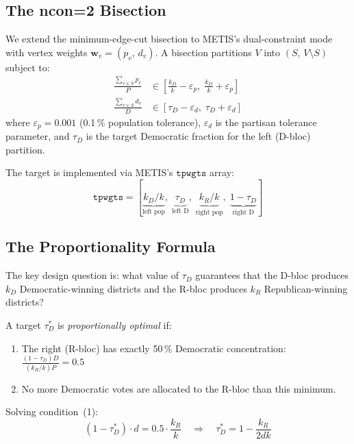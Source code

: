 \subsection{The ncon=2 Bisection}

We extend the minimum-edge-cut bisection to METIS's dual-constraint mode with
vertex weights $\mathbf{w}_v = (p_v,\, d_v)$.
A bisection partitions $V$ into $(S,\, V \setminus S)$ subject to:
\begin{align}
  \frac{\sum_{v \in S} p_v}{P} &\in \left[\frac{k_D}{k} - \varepsilon_p,\; \frac{k_D}{k} + \varepsilon_p\right] \label{eq:pop-balance}\\
  \frac{\sum_{v \in S} d_v}{D} &\in \left[\tau_D - \varepsilon_d,\; \tau_D + \varepsilon_d\right] \label{eq:dem-balance}
\end{align}
where $\varepsilon_p = 0.001$ (0.1\,\% population tolerance), $\varepsilon_d$ is
the partisan tolerance parameter, and $\tau_D$ is the target Democratic fraction
for the left (D-bloc) partition.

The target is implemented via METIS's $\mathtt{tpwgts}$ array:
\[
  \mathtt{tpwgts} = [\underbrace{k_D/k}_{\text{left pop}},\; \underbrace{\tau_D}_{\text{left D}},\;
                     \underbrace{k_R/k}_{\text{right pop}},\; \underbrace{1-\tau_D}_{\text{right D}}]
\]

\subsection{The Proportionality Formula}
\label{sec:formula}

The key design question is: what value of $\tau_D$ guarantees that the D-bloc
produces $k_D$ Democratic-winning districts and the R-bloc produces $k_R$
Republican-winning districts?

\begin{definition}
A target $\tau_D^*$ is \emph{proportionally optimal} if:
\begin{enumerate}
  \item The right (R-bloc) has exactly 50\,\% Democratic concentration:
    $\frac{(1-\tau_D) D}{(k_R/k) P} = 0.5$
  \item No more Democratic votes are allocated to the R-bloc than this minimum.
\end{enumerate}
\end{definition}

Solving condition~(1):
\[
  (1 - \tau_D^*) \cdot d = 0.5 \cdot \frac{k_R}{k}
  \quad \Longrightarrow \quad
  \tau_D^* = 1 - \frac{k_R}{2dk}
\]

